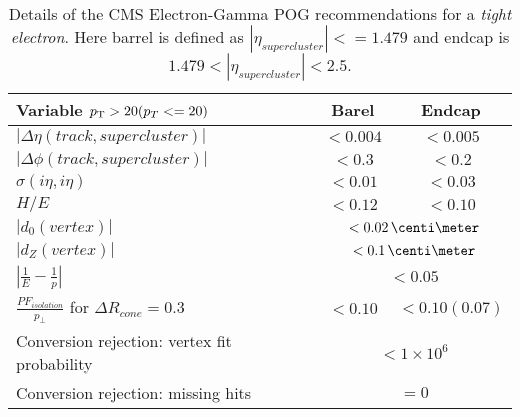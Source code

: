 \begin{table}[!htp]
\centering
\begin{tabular}{|l|c|c|}
\hline
Variable  $p_{\mathrm{T}} > 20 (p_{T} <= 20)$ & Barel & Endcap \\
\hline\hline
$| \Delta\eta(track,supercluster) |$                           & $<0.004$ & $<0.005$ \\
$| \Delta\phi(track,supercluster) |$                           & $<0.3  $ & $<0.2  $ \\
$ \sigma(i\eta,i\eta)$                                         & $<0.01 $ & $<0.03 $ \\
$H/E$                                                          & $<0.12 $ & $<0.10 $ \\
\cline{2-3}
$|d_{0}(vertex)|$                                              & \multicolumn{2}{c|}{$<0.02\,\centi\meter$} \\
$|d_{Z}(vertex)|$                                              & \multicolumn{2}{c|}{$<0.1\,\centi\meter$}  \\
$|\frac{1}{E}-\frac{1}{p}| $                                   & \multicolumn{2}{c|}{$<0.05$} \\
\cline{2-3}
$\frac{PF_{isolation}}{p_{\perp}}$ for $ \Delta R_{cone}=0.3$ & $<0.10 $ & $<0.10(0.07)$ \\
\cline{2-3}
Conversion rejection: vertex fit probability                   & \multicolumn{2}{c|}{$<1 \times 10^{6}$}  \\
Conversion rejection: missing hits                             & \multicolumn{2}{c|}{$=0$} \\
\hline
\end{tabular}
\caption{Details of the \gls{CMS} Electron-Gamma \gls{POG} recommendations for a \textit{tight electron}. Here barrel is defined as $ |\eta_{supercluster}|<=1.479 $ and endcap is $ 1.479 < |\eta_{supercluster}| < 2.5 $.}
\label{TABLE:PhysicsObjects_ElectronPOG_CutBased_TightElectronRequirements}
\end{table}
